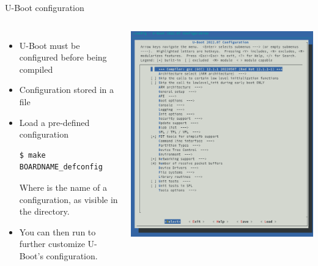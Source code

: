 \begin{frame}[fragile]{U-Boot configuration}
  \begin{columns}
    \begin{itemize}
    \item U-Boot must be configured before being compiled
    \item Configuration stored in a  file
    \item Load a pre-defined configuration
\begin{verbatim}
$ make BOARDNAME_defconfig
\end{verbatim}
      Where  is the name of a configuration, as
      visible in the  directory.
    \item You can then run  to further customize
      U-Boot's configuration.
    \end{itemize}
    \includegraphics[width=\textwidth]{slides/sysdev-bootloaders-u-boot/uboot-menuconfig.png}
  \end{columns}
\end{frame}

